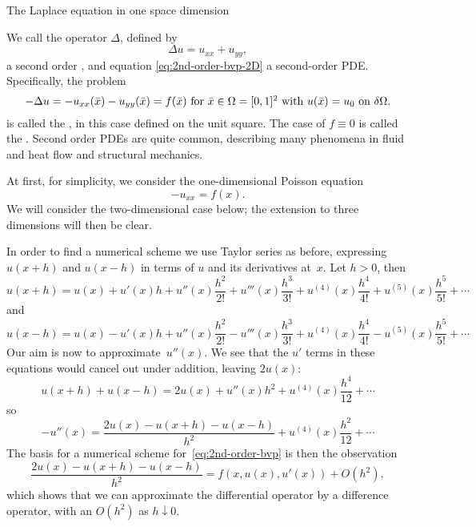  {The Laplace equation in one space dimension}
\label{sec:poisson}
\label{sec:1dbvp}

We call the operator $\Delta$, defined by
\begin{equation}
  \Delta u = u_{xx}+u_{yy},
\end{equation}
a second order , and equation
\eqref{eq:2nd-order-bvp-2D} a second-order
\ac{PDE}. Specifically, the problem
\begin{equation}
 \hbox{$-\Delta u = -u_{xx}(\bar x)-u_{yy}(\bar x)=f(\bar x)$ for
   $\bar x\in\Omega=[0,1]^2$ 
    with $u(\bar x)=u_0$ on $\delta\Omega$.}
 \label{eq:2nd-order-bvp-poisson}
 \end{equation}
is called the , in this case defined on
the unit square.
The case of $f\equiv0$ is called the .
Second order \acp{PDE} are quite common, describing many phenomena in
fluid and heat flow and structural mechanics.

At first, for simplicity, we consider the one-dimensional Poisson
equation
\begin{equation}
  -u_{xx}=f(x). 
\end{equation}
We will consider the two-dimensional case below; the extension to three
dimensions will then be clear.

In order to find a numerical scheme we use Taylor series as before,
expressing $u(x+h)$ and $u(x-h)$ in terms of $u$ and its derivatives
at~$x$. Let $h>0$, then
\begin{equation}
  u(x+h)=u(x)+u'(x)h+u''(x)\frac{h^2}{2!}+u'''(x)\frac{h^3}{3!}
  +u^{(4)}(x)\frac{h^4}{4!}+u^{(5)}(x)\frac{h^5}{5!}+\cdots
\end{equation}
and
\begin{equation}
  u(x-h)=u(x)-u'(x)h+u''(x)\frac{h^2}{2!}-u'''(x)\frac{h^3}{3!}
  +u^{(4)}(x)\frac{h^4}{4!}-u^{(5)}(x)\frac{h^5}{5!}+\cdots
\end{equation}
Our aim is now to approximate~$u''(x)$.
We see that the $u'$ terms in these equations would cancel out under
addition, leaving $2u(x)$:
\begin{equation}
  u(x+h)+u(x-h)=2u(x)+u''(x)h^2+u^{(4)}(x)\frac{h^4}{12}+\cdots
\end{equation}
so
\begin{equation}
 -u''(x)=\frac{2u(x)-u(x+h)-u(x-h)}{h^2}+u^{(4)}(x)\frac{h^2}{12}+\cdots
 \label{eq:2nd-order-num}
\end{equation}
The basis for a numerical scheme for~\eqref{eq:2nd-order-bvp} is then
the observation
\begin{equation}
  \frac{2u(x)-u(x+h)-u(x-h)}{h^2}=f(x,u(x),u'(x))+O(h^2),
\end{equation}
which shows that we can approximate the differential operator by a
difference operator, with an $O(h^2)$ 
as $h\downarrow0$.

